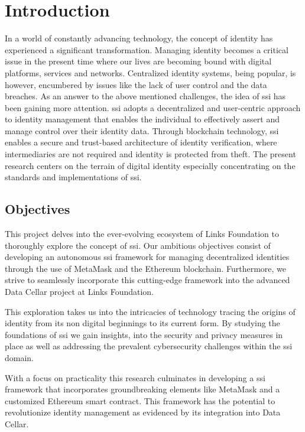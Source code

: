 \chapter{Introduction} \label{ch:introduction}

In a world of constantly advancing technology, the concept of identity has experienced a significant transformation. Managing identity becomes a critical issue in the 
present time where our lives are becoming bound with digital platforms, services and networks. Centralized identity systems, being popular, is however, encumbered by 
issues like the lack of user control and the data breaches. As an answer to the above mentioned challenges, the idea of \acrfull{ssi} has been gaining more attention. \acrshort{ssi} 
adopts a decentralized and user-centric approach to identity management that enables the individual to effectively assert and manage control over their identity data. 
Through blockchain technology, \acrshort{ssi} enables a secure and trust-based architecture of identity verification, where intermediaries are not required and identity is 
protected from theft. The present research centers on the terrain of digital identity especially concentrating on the standards and implementations of \acrshort{ssi}.

\section{Objectives} 

This project delves into the ever-evolving ecosystem of Links Foundation to thoroughly explore the concept of \acrshort{ssi}. Our ambitious objectives 
consist of developing an autonomous \acrshort{ssi} framework for managing decentralized identities through the use of MetaMask and the Ethereum blockchain. Furthermore, we strive to 
seamlessly incorporate this cutting-edge framework into the advanced Data Cellar project at Links Foundation.

This exploration takes us into the intricacies of technology tracing the origins of identity from its non digital beginnings to its current form. By studying the foundations
of \acrshort{ssi} we gain insights, into the security and privacy measures in place as well as addressing the prevalent cybersecurity challenges within the \acrshort{ssi} domain.

With a focus on practicality this research culminates in developing a \acrshort{ssi} framework that incorporates groundbreaking elements like MetaMask and a customized Ethereum smart 
contract. This framework has the potential to revolutionize identity management as evidenced by its integration into Data Cellar.

